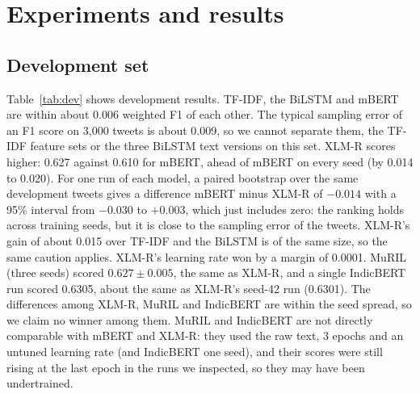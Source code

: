 \documentclass{nle}
\begin{document}
\section{Experiments and results}
\subsection{Development set}
Table~\ref{tab:dev} shows development results. TF-IDF, the BiLSTM and mBERT are within about 0.006 weighted F1 of each
other. The typical sampling error of an F1 score on 3{,}000 tweets is about 0.009, so we cannot separate them, the TF-IDF
feature sets or the three BiLSTM text versions on this set. XLM-R scores higher: 0.627 against 0.610 for mBERT, ahead of
mBERT on every seed (by 0.014 to 0.020). For one run of each model, a paired bootstrap over the same development tweets gives
a difference mBERT minus XLM-R of $-0.014$ with a 95\% interval from $-0.030$ to $+0.003$, which just includes zero: the
ranking holds across training seeds, but it is close to the sampling error of the tweets. XLM-R's gain of about 0.015 over
TF-IDF and the BiLSTM is of the same size, so the same caution applies. XLM-R's learning rate won by a margin of 0.0001. MuRIL (three seeds) scored $0.627 \pm 0.005$, the same as XLM-R, and a single IndicBERT run scored 0.6305, about the same as
XLM-R's seed-42 run (0.6301). The differences among XLM-R, MuRIL and IndicBERT are within the seed spread, so we claim no winner
among them. MuRIL and IndicBERT are not directly comparable with mBERT and XLM-R: they used the raw text, 3 epochs and an untuned
learning rate (and IndicBERT one seed), and their scores were still rising at the last epoch in the runs we inspected, so they
may have been undertrained.
\end{document}
